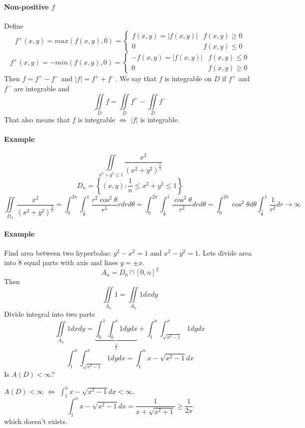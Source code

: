 \paragraph{Non-positive $f$}
Define
$$f^+(x,y) = max(f(x,y), 0)=\begin{cases}
f(x,y)=|f(x,y)|& f(x,y) \geq 0\\0&f(x,y) \leq 0
\end{cases}$$
$$f^+(x,y) = -min(f(x,y), 0)=\begin{cases}
-f(x,y)=|f(x,y)|& f(x,y) \leq 0\\0&f(x,y) \geq 0
\end{cases}$$
Then
$f = f^+ - f^-$ and $|f| = f^+ + f^-$.
We say that $f$ is integrable on $D$ if $f^+$ and $f^-$ are integrable and
$$\iint\limits_{D} f= \iint\limits_{D} f^+ - \iint\limits_{D} f^-$$
That also means that $f$ is integrable $\iff$ $|f|$ is integrable.
\paragraph{Example}
$$\iint\limits_{x^2+y^2\leq 1} \frac{x^2}{(x^2+y^2)^{\frac{5}{2}}}$$
$$D_n = \left\{ (x,y): \frac{1}{n} \leq x^2+y^2 \leq 1 \right\}$$
$$\iint\limits_{D_n} \frac{x^2}{(x^2+y^2)^{\frac{5}{2}}} = \int_0^{2\pi}\int_{\frac{1}{n}}^1 \frac{r^2 \cos^2 \theta}{r^5}r dr d\theta =  \int_0^{2\pi}\int_{\frac{1}{n}}^1 \frac{\cos^2 \theta}{r^2} dr d\theta = \int_0^{2\pi}\cos^2 \theta d\theta \int_{\frac{1}{n}}^1 \frac{1}{r^2} dr \to \infty$$
\paragraph{Example}
Find area between two hyperbolas:
$y^2-x^2=1$ and $x^2-y^2=1$.
Lets divide area into 8 equal parts with axis and lines $y=\pm x$. 
$$A_n = D_0 \cap [0,n]^2$$
Then
$$\iint\limits_{A_n} 1 = \iint\limits_{A_n} 1 dx dy$$
Divide integral into two parts
$$\iint\limits_{A_n} 1 dx dy = \underbrace{\int_0^1 \int_{0}^{x} 1 dy dx}_{\frac{1}{2}} + \int_1^n \int_{\sqrt{x^2-1}}^x 1 dy dx $$
$$\int_1^n \int_{\sqrt{x^2-1}}^x 1 dy dx = \int_1^n x-\sqrt{x^2-1} dx$$
Is $A(D) < \infty$?

$A(D) < \infty$ $\iff$ $\int_1^n x-\sqrt{x^2-1} dx < \infty$.
$$\int_1^n x-\sqrt{x^2-1} dx = \frac{1}{x+\sqrt{x^2+1}} \geq \frac{1}{2x}$$
which doesn't exists.
